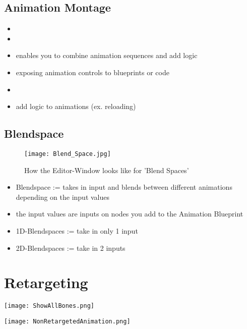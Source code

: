         \subsection{Animation Montage}
            \begin{itemize}
                \item 
                \item 
                \item enables you to combine animation sequences and add logic
                \item exposing animation controls to blueprints or code
                \item 
                \item add logic to animations (ex. reloading)
            \end{itemize}

        \subsection{Blendspace}
        \begin{figure}
            \texttt{[image: Blend\_Space.jpg]}
            \caption{How the Editor-Window looks like for 'Blend Spaces'}
        \end{figure}
        \begin{itemize}
            \item Blendspace := takes in input and blends between different animations depending on the input values
            \item the input values are inputs on nodes you add to the Animation Blueprint
            \item 1D-Blendspaces := take in only 1 input
            \item 2D-Blendspaces := take in 2 inputs
        \end{itemize}


    \section{Retargeting}
        \begin{minipage}{0.9\textwidth}
            \begingroup \parfillskip=0pt
                \begin{minipage}[t]{0.49\textwidth}
                    \texttt{[image: ShowAllBones.png]}

                    \label{}
                \end{minipage}
                \begin{minipage}[t]{0.49\textwidth}
                    \texttt{[image: NonRetargetedAnimation.png]}

                    \label{}
                \end{minipage}
            \par\endgroup
        \end{minipage}
        
